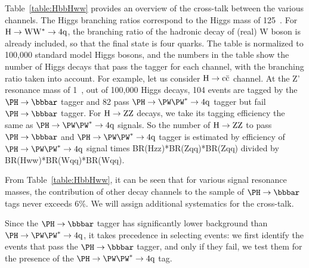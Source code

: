 Table~\ref{table:HbbHww} provides an overview of the cross-talk
between the various channels.  The Higgs branching ratios correspond
to the Higgs mass of 125~\GeVcc. 
 For ${\rm H \to WW^* \to 4q }$,
the branching ratio of the hadronic decay of (real) W boson is already 
included, so that the final state is four quarks.
%
The table is normalized to 100,000 standard model Higgs
bosons, and the numbers in the
table show the number of Higgs decays that pass the tagger for each
channel, with the branching ratio taken into account.  For example, 
let us consider ${\rm H \to c\bar{c}}$ channel.  At the Z' resonance
mass of 1~\TeVcc, out of 100,000 Higgs decays,  104 events 
are tagged by the $\Hbb$ tagger  
and  82  pass $\Hww$ tagger but fail $\Hbb$ tagger.
For ${\rm H \to ZZ}$ decays, we take its tagging efficiency the same 
as $\Hww$ signals. So the number of ${\rm H \to ZZ}$ to pass $\Hbb$ and 
$\Hww$ tagger is estimated by 
efficiency of $\Hww$ signal times 
 BR(Hzz)*BR(Zqq)*BR(Zqq) divided by BR(Hww)*BR(Wqq)*BR(Wqq). 

From Table~\ref{table:HbbHww}, it can be seen that for various signal 
resonance masses, the contribution of other decay channels to the 
sample of $\Hbb$ tags never exceeds 6\%. We will assign additional systematics
for the cross-talk.  


Since the $\Hbb$ tagger has significantly lower background than $\Hww$,
it takes precedence in selecting events: we first identify the
events that pass the $\Hbb$ tagger, and only if they fail,  we
test them for the presence of the $\Hww$ tag.  


